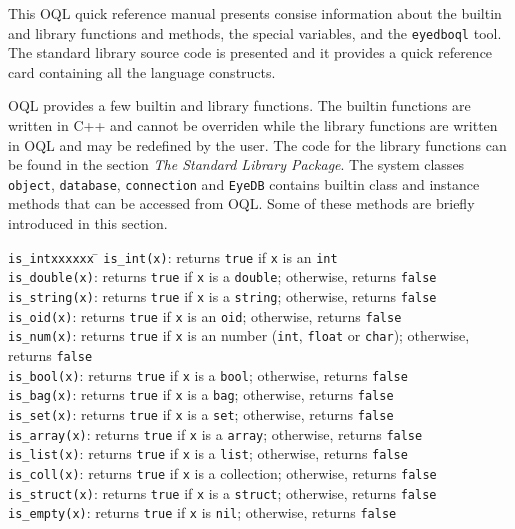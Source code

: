 \newpage
{}
\label{qref}
This OQL quick reference manual presents consise information about
the builtin and library functions and methods, the special variables,
and the \texttt{eyedboql} tool. The standard library source code
is presented and it provides a quick reference card containing
all the language constructs.

OQL provides a few builtin and library functions. The builtin functions
are written in C++ and cannot be overriden while the library functions
are written in OQL and may be redefined by the user.
The code for the library functions can be found in the section
\emph{The Standard Library Package}. The \eyedb system classes
\texttt{object}, \texttt{database}, \texttt{connection} and \texttt{EyeDB} contains
builtin class and instance methods that can be accessed from OQL.
Some of these methods are briefly introduced in this section.

\begin{tabbing}
\texttt{is\_intxxxxxx} \= \kill
\texttt{is\_int(x)}\>: returns \texttt{true} if \texttt{x} is an \texttt{int}\\
\texttt{is\_double(x)}\>: returns \texttt{true} if \texttt{x} is
a \texttt{double}; otherwise, returns \texttt{false}\\
\texttt{is\_string(x)}\>: returns \texttt{true} if \texttt{x} is
a \texttt{string}; otherwise, returns \texttt{false}\\
\texttt{is\_oid(x)}\>: returns \texttt{true} if \texttt{x} is
an \texttt{oid}; otherwise, returns \texttt{false}\\
\texttt{is\_num(x)}\>: returns \texttt{true} if \texttt{x} is
an number (\texttt{int}, \texttt{float} or \texttt{char});
otherwise, returns \texttt{false}\\
\texttt{is\_bool(x)}\>: returns \texttt{true} if \texttt{x} is
a \texttt{bool}; otherwise, returns \texttt{false}\\
\texttt{is\_bag(x)}\>: returns \texttt{true} if \texttt{x} is
a \texttt{bag}; otherwise, returns \texttt{false}\\
\texttt{is\_set(x)}\>: returns \texttt{true} if \texttt{x} is
a \texttt{set}; otherwise, returns \texttt{false}\\
\texttt{is\_array(x)}\>: returns \texttt{true} if \texttt{x} is
a \texttt{array}; otherwise, returns \texttt{false}\\
\texttt{is\_list(x)}\>: returns \texttt{true} if \texttt{x} is
a \texttt{list}; otherwise, returns \texttt{false}\\
\texttt{is\_coll(x)}\>: returns \texttt{true} if \texttt{x} is
a collection; otherwise, returns \texttt{false}\\
\texttt{is\_struct(x)}\>: returns \texttt{true} if \texttt{x} is
a \texttt{struct}; otherwise, returns \texttt{false}\\
\texttt{is\_empty(x)}\>: returns \texttt{true} if \texttt{x} is
\texttt{nil}; otherwise, returns \texttt{false}\\
\end{tabbing}

